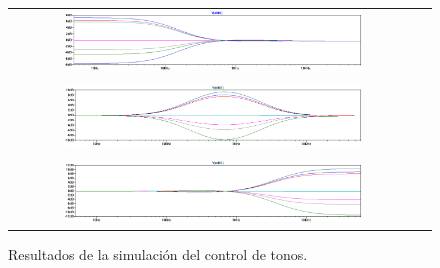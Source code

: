 \begin{figure}[H]
\centering
\begin{tabular}{cc}
\includegraphics[width=0.75\textwidth]{img/tonos_sim_1.png}\\
\\
\includegraphics[width=0.75\textwidth]{img/tonos_sim_2.png}\\
\\
\includegraphics[width=0.75\textwidth]{img/tonos_sim_3.png}
\end{tabular}
\caption{Resultados de la simulación del control de tonos.}
\label{tonos_sim} 
\end{figure}



\medskip